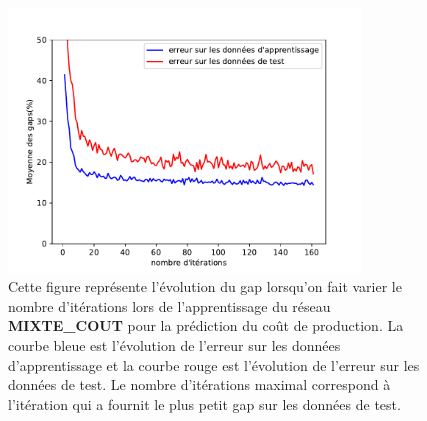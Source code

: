 \begin{figure}[H]
	\centerline{
		\includegraphics[height=7cm]{images_these/Gap_PROD_prediction_reseaufonctionnel_testtrain_data2.pdf}}
	\caption[Le gap du réseau MIXTE\_COUT]{Cette figure représente l'évolution du gap lorsqu'on fait varier le nombre d'itérations lors de l'apprentissage du réseau \textbf{MIXTE\_COUT} pour la prédiction du coût de production. La courbe bleue est l'évolution de l'erreur sur les données d'apprentissage et la courbe rouge est l'évolution de l'erreur sur les données de test. Le nombre d'itérations maximal correspond à l'itération qui a fournit le plus petit gap sur les données de test.}
	\label{6000_loss_prediction_courbe_Al_He_}
\end{figure}




